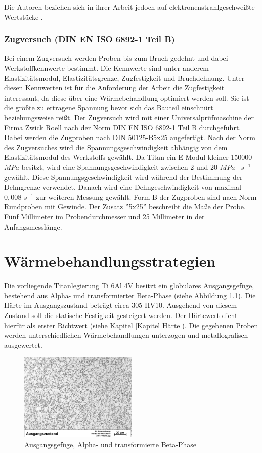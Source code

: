 \documentclass[a4paper, 11pt]{tubsreprt}
\begin{document}
Die Autoren beziehen sich in ihrer Arbeit jedoch auf elektronenstrahlgeschweißte Wertstücke \cite{Shi2013}.
\subsection{Zugversuch (DIN EN ISO 6892-1 Teil B)}
\label{Kapitel Zugversuch}
Bei einem Zugversuch werden Proben bis zum Bruch gedehnt und dabei Werkstoffkennwerte bestimmt. Die Kennwerte sind unter anderem  Elastizitätsmodul, Elastizitätsgrenze, Zugfestigkeit und Bruchdehnung. Unter diesen Kennwerten ist für die Anforderung der Arbeit die Zugfestigkeit interessant, da diese über eine Wärmebehandlung optimiert werden soll. Sie ist die größte zu ertragene Spannung bevor sich das Bauteil einschnürt beziehungsweise reißt. Der Zugversuch wird mit einer Universalprüfmaschine der Firma Zwick Roell nach der Norm DIN EN ISO 6892-1 Teil B durchgeführt. Dabei werden die Zugproben nach DIN 50125-B5x25 angefertigt. Nach der Norm des Zugversuches wird die Spannungsgeschwindigkeit abhängig von dem Elastizitätsmodul des Werkstoffs gewählt. Da Titan ein E-Modul kleiner 150000 $MPa$ besitzt, wird eine Spannungsgeschwindigkeit zwischen 2 und 20 $MPa$~ $s^{-1}$ gewählt. Diese Spannungsgeschwindigkeit wird während der Bestimmung der Dehngrenze verwendet. Danach wird eine Dehngeschwindigkeit von maximal $0,008$ $s^{-1}$ zur weiteren Messung gewählt. Form B der Zugproben sind nach Norm Rundproben mit Gewinde. Der Zusatz ''5x25'' beschreibt die Maße der Probe. Fünf Millimeter im Probendurchmesser und 25 Millimeter in der Anfangsmesslänge.



\chapter{Wärmebehandlungsstrategien}
Die vorliegende Titanlegierung Ti 6Al 4V besitzt ein globulares Ausgangsgefüge, bestehend aus Alpha- und transformierter Beta-Phase (siehe Abbildung \ref{ausgangsgefüge Kapitel3}). Die Härte im Ausgangszustand beträgt circa 305 HV10. Ausgehend von diesem Zustand soll die statische Festigkeit gesteigert werden. Der Härtewert dient hierfür als erster Richtwert (siehe Kapitel \ref{Kapitel Härte}). Die gegebenen Proben werden unterschiedlichen Wärmebehandlungen unterzogen und metallografisch ausgewertet. 

\begin{figure}
\centering
\includegraphics[width=0.5\textwidth]{Bilder/Ausgangsgefuege.jpg}
\caption{Ausgangsgefüge, Alpha- und transformierte Beta-Phase}
\label{ausgangsgefüge Kapitel3}
\end{figure}
\end{document}
